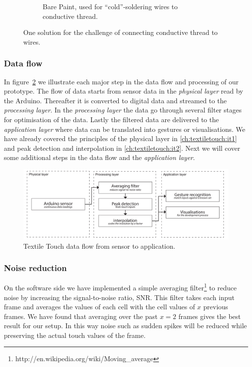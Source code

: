 \begin{figure}[t]
\begin{subfigure}[t]{.44\textwidth}
  \caption{Bare Paint, used for ``cold''-soldering wires to conductive thread.}
\end{subfigure}
\caption{One solution for the challenge of connecting conductive thread to wires.}
\label{fig:ch:textiletouch:barepaint}
\end{figure}

\subsubsection{Data flow}
In figure~\ref{fig:textiletouch:dataflow} we illustrate each major step in the data flow and processing 
of our prototype.
The flow of data starts from sensor data in the \emph{physical layer} read by the Arduino.
Thereafter it is converted to digital data and streamed to the \emph{processing layer}.
In the \emph{processing layer} the data go through several filter stages for optimisation of the data.
Lastly the filtered data are delivered to the \emph{application layer} where data can be translated into gestures or visualisations.
We have already covered the principles of the physical layer in \ref{ch:textiletouch:it1} and peak detection and interpolation in \ref{ch:textiletouch:it2}.
Next we will cover some additional steps in the data flow and the \emph{application layer}.

\begin{figure}[b]
  \centering
      \includegraphics[width=.9\textwidth]{figures/touch/dataflow}
  \caption[The data flow from sensor to application.]
   {Textile Touch data flow from sensor to application.}
   \label{fig:textiletouch:dataflow}
\end{figure}

\subsubsection{Noise reduction}
On the software side we have implemented a simple averaging filter\footnote{http://en.wikipedia.org/wiki/Moving\_average} to reduce noise by increasing the signal-to-noise ratio, SNR.
This filter takes each input frame and averages the values of each cell with the cell values of \(x\) previous frames.
We have found that averaging over the past \(x = 2\) frames gives the best result for our setup. 
In this way noise such as sudden spikes will be reduced while preserving the actual touch values of the frame.

